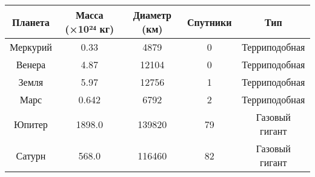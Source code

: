 \documentclass{article}
\begin{document}
\begin{tabular}{|c|c|c|c|c|}
\hline
Планета & Масса (×10²⁴ кг) & Диаметр (км) & Спутники & Тип \\
\hline
Меркурий & 0.33 & 4879 & 0 & Терриподобная \\
\hline
Венера & 4.87 & 12104 & 0 & Терриподобная \\
\hline
Земля & 5.97 & 12756 & 1 & Терриподобная \\
\hline
Марс & 0.642 & 6792 & 2 & Терриподобная \\
\hline
Юпитер & 1898.0 & 139820 & 79 & Газовый гигант \\
\hline
Сатурн & 568.0 & 116460 & 82 & Газовый гигант \\
\hline
\end{tabular}
\end{document}
